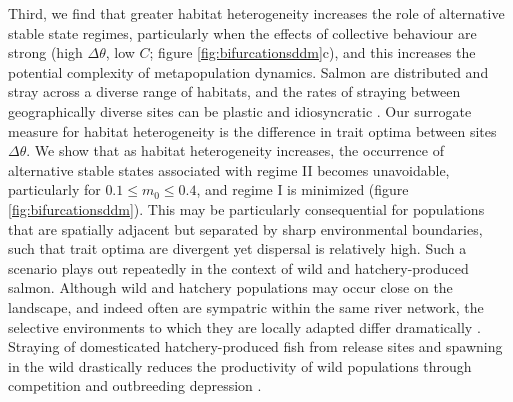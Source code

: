 \documentclass{revtex4}
\begin{document}
Third, we find that greater habitat heterogeneity increases the role of alternative stable state regimes, particularly when the effects of collective behaviour are strong (high $\Delta\theta$, low $C$; figure \ref{fig:bifurcationsddm}c), and this increases the potential complexity of metapopulation dynamics.
Salmon are distributed and stray across a diverse range of habitats, and the rates of straying between geographically diverse sites can be plastic and idiosyncratic \citep{Westley:2015to}.
Our surrogate measure for habitat heterogeneity is the difference in trait optima between sites $\Delta\theta$.
We show that as habitat heterogeneity increases, the occurrence of alternative stable states associated with regime II becomes unavoidable, particularly for $0.1 \leq m_0 \leq 0.4$, and regime I is minimized (figure \ref{fig:bifurcationsddm}).
This may be particularly consequential for populations that are spatially adjacent but separated by sharp environmental boundaries, such that trait optima are divergent yet dispersal is relatively high.
Such a scenario plays out repeatedly in the context of wild and hatchery-produced salmon. 
Although wild and hatchery populations may occur close on the landscape, and indeed often are sympatric within the same river network, the selective environments to which they are locally adapted differ dramatically \citep{Christie:2012bj}. 
Straying of domesticated hatchery-produced fish from release sites and spawning in the wild drastically reduces the productivity of wild populations through competition and outbreeding depression \citep{Chilcote:2003bb,Araki:2007cm}.
\end{document}
